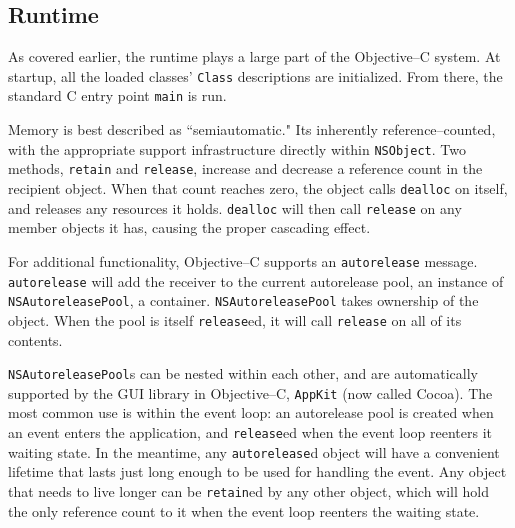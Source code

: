 
\subsection{Runtime}
	As covered earlier, the runtime plays a large part of the Objective--C system.  At startup, all the loaded classes' \texttt{Class} descriptions are initialized.  From there, the standard C entry point \texttt{main} is run.  

	Memory is best described as ``semiautomatic."  Its inherently reference--counted, with the appropriate support infrastructure directly within \texttt{NSObject}.  Two methods, \texttt{retain} and \texttt{release}, increase and decrease a reference count in the recipient object.  When that count reaches zero, the object calls \texttt{dealloc} on itself, and releases any resources it holds.  \texttt{dealloc} will then call \texttt{release} on any member objects it has, causing the proper cascading effect.

	For additional functionality, Obj\-ect\-ive--C supports an \texttt{aut\-or\-el\-ease} message.  \texttt{autorelease} will add the receiver to the current autorelease pool, an instance of \texttt{NSAutoreleasePool}, a container.  \texttt{NSAutoreleasePool} takes ownership of the object.  When the pool is itself \texttt{release}ed, it will call \texttt{release} on all of its contents.

	\texttt{NSAutoreleasePool}s can be nested within each other, and are automatically supported by the GUI library in Objective--C, \texttt{AppKit} (now called Cocoa\cite{cocoa}).  The most common use is within the event loop: an autorelease pool is created when an event enters the application, and \texttt{release}ed when the event loop reenters it waiting state.  In the meantime, any \texttt{autorelease}d object will have a convenient lifetime that lasts just long enough to be used for handling the event.  Any object that needs to live longer can be \texttt{retain}ed by any other object, which will hold the only reference count to it when the event loop reenters the waiting state.

